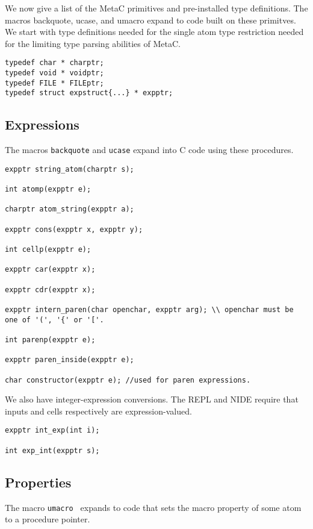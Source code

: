 \documentclass{article}
\begin{document}
We now give a list of the MetaC primitives and pre-installed type definitions.  The macros backquote, ucase, and umacro expand to code built on these primitves.
We start with type definitions needed for the single atom type restriction needed for the limiting type parsing abilities of MetaC.

\begin{verbatim}
typedef char * charptr;
typedef void * voidptr;
typedef FILE * FILEptr;
typedef struct expstruct{...} * expptr;
\end{verbatim}

\subsection{Expressions}

The macros {\tt backquote} and {\tt ucase} expand into C code using these procedures.

\begin{verbatim}
expptr string_atom(charptr s);

int atomp(expptr e);

charptr atom_string(expptr a);

expptr cons(expptr x, expptr y);

int cellp(expptr e);

expptr car(expptr x);

expptr cdr(expptr x);

expptr intern_paren(char openchar, expptr arg); \\ openchar must be one of '(', '{' or '['.

int parenp(expptr e);

expptr paren_inside(expptr e);

char constructor(expptr e); //used for paren expressions.
\end{verbatim}

We also have integer-expression conversions.  The REPL and NIDE require that inputs and cells respectively are expression-valued.

\begin{verbatim}
expptr int_exp(int i);

int exp_int(expptr s);
\end{verbatim}

\subsection{Properties}

The macro {\tt umacro } expands to code that
sets the macro property of some atom to a procedure pointer.
\end{document}

